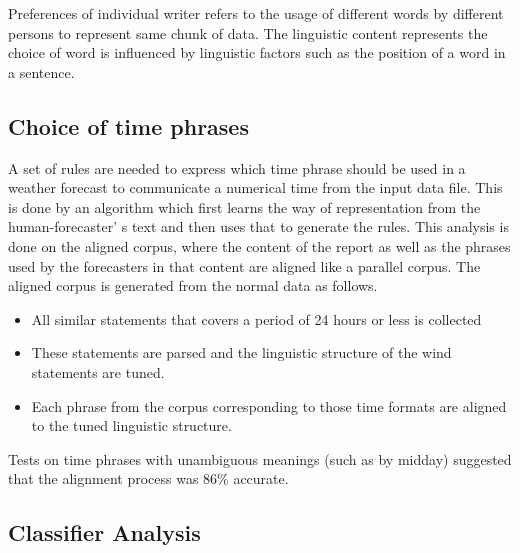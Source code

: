 \documentclass{bmcart}
\begin{document}
Preferences of individual writer refers to the usage of different words by different persons to represent same chunk of data. The linguistic content represents the choice of word is influenced by linguistic factors such as the position of a word in a sentence.

\subsection{Choice of time phrases}
\label{ssec:phraseChoice}
A set of rules are needed to express which time phrase should be used in a weather forecast to communicate a numerical time from the input data file. This is done by an algorithm which first learns the way of representation from the human-forecaster' s text and then uses that to generate the rules. This analysis is done on the aligned corpus, where the content of the report as well as the phrases used by the forecasters in that content are aligned like a parallel corpus. The aligned corpus is generated from the normal data as follows.
\begin{itemize}
\item All similar statements that covers a period of 24 hours or less is collected
\item These statements are parsed and the linguistic structure of the wind statements are tuned.
\item Each phrase from the corpus corresponding to those time formats are aligned to the tuned linguistic structure. 
\end{itemize}
Tests on time phrases with unambiguous meanings (such as by midday) suggested that the alignment process was 86\% accurate.

\subsection{Classifier Analysis}
\label{ssec:classifyAnalysis}
\end{document}
